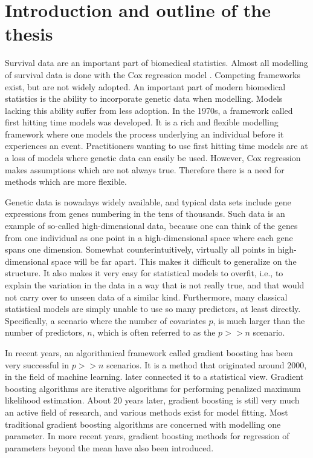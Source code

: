 \chapter{Introduction and outline of the thesis}
\label{sec:intro}
Survival data are an important part of biomedical statistics.
Almost all modelling of survival data is done with the Cox regression model \citep{cox1965}.
Competing frameworks exist, but are not widely adopted.
An important part of modern biomedical statistics is the ability to incorporate genetic data when modelling.
Models lacking this ability suffer from less adoption.
In the 1970s, a framework called first hitting time models was developed.
It is a rich and flexible modelling framework where one models the process underlying an individual before it experiences an event.
Practitioners wanting to use first hitting time models are at a loss of models where genetic data can easily be used.
However, Cox regression makes assumptions which are not always true.
Therefore there is a need for methods which are more flexible.

Genetic data is nowadays widely available, and typical data sets include gene expressions from genes numbering in the tens of thousands.
Such data is an example of so-called high-dimensional data, because one can think of the genes from one individual as one point in a high-dimensional space where each gene spans one dimension.
Somewhat counterintuitively, virtually all points in high-dimensional space will be far apart.
This makes it difficult to generalize on the structure.
It also makes it very easy for statistical models to overfit, i.e., to explain the variation in the data in a way that is not really true, and that would not carry over to unseen data of a similar kind.
Furthermore, many classical statistical models are simply unable to use so many predictors, at least directly.
Specifically, a scenario where the number of covariates $p$, is much larger than the number of predictors, $n$, which is often referred to as the $p>>n$ scenario.

In recent years, an algorithmical framework called gradient boosting has been very successful in $p>>n$ scenarios.
It is a method that originated around 2000, in the field of machine learning.
\citet{friedman2001} later connected it to a statistical view.
Gradient boosting algorithms are iterative algorithms for performing penalized maximum likelihood estimation.
About 20 years later, gradient boosting is still very much an active field of research, and various methods exist for model fitting.
Most traditional gradient boosting algorithms are concerned with modelling one parameter.
In more recent years, gradient boosting methods for regression of parameters beyond the mean have also been introduced.

